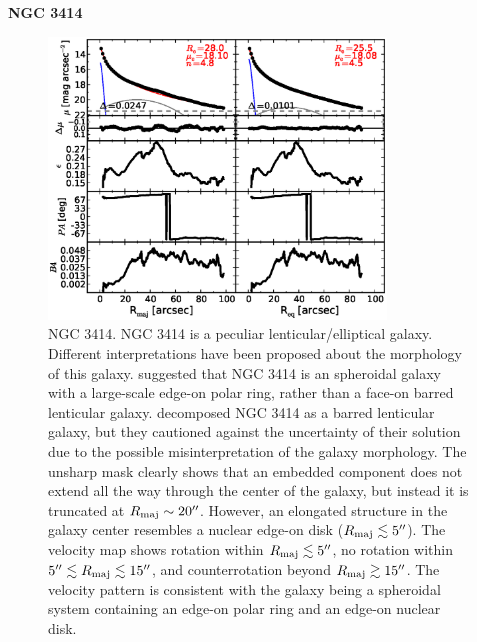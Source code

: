 \documentclass[preprint2]{emulateapj}
\newcommand{\fitfigurewidth}{0.8\textwidth}
\begin{document}
  \clearpage\newpage\noindent
  {\bf NGC 3414 \\}

  \begin{figure}[h]
  \begin{center}
  \includegraphics[width=\fitfigurewidth]{images/n3414_1Dfit.eps}
  \caption{NGC 3414.
  NGC 3414 is a peculiar lenticular/elliptical galaxy. 
  Different interpretations have been proposed about the morphology of this galaxy.
  \cite{whitmore1990} suggested that NGC 3414 is an spheroidal galaxy 
  with a large-scale edge-on polar ring, rather than a face-on barred lenticular galaxy.
  \cite{laurikainen2010} decomposed NGC 3414 as a barred lenticular galaxy, but 
  they cautioned against the uncertainty of their solution due to the possible misinterpretation of the galaxy morphology.
  The unsharp mask clearly shows that an embedded component does not extend all the way through the 
  center of the galaxy, but instead it is truncated at $R_{\rm maj} \sim 20''$.
  However, an elongated structure in the galaxy center resembles a nuclear edge-on disk ($R_{\rm maj} \lesssim 5''$).
  The velocity map shows rotation within $R_{\rm maj} \lesssim 5''$, no rotation within $5'' \lesssim R_{\rm maj} \lesssim 15''$,
  and counterrotation beyond $R_{\rm maj} \gtrsim 15''$.
  The velocity pattern is consistent with the galaxy being a spheroidal system containing an edge-on polar ring and an edge-on nuclear disk.
  }
  \end{center}
  \end{figure}
\end{document}
